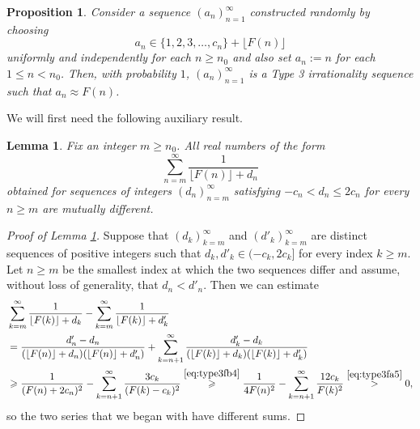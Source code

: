 \documentclass[11pt,letterpaper,reqno]{amsart}
\numberwithin{equation}{section}
\newtheorem{lemma}[theorem]{Lemma}
\newtheorem{proposition}[theorem]{Proposition}
\theoremstyle{definition}
\numberwithin{equation}{section}
\begin{document}
\begin{proposition}\label{prop:type3faster}
Consider a sequence $(a_n)_{n=1}^{\infty}$ constructed randomly by choosing
\[ a_n \in \{1,2,3,\ldots,c_n\} + \lfloor F(n)\rfloor \]
uniformly and independently for each $n\geqslant n_0$ and also set $a_n := n$ for each $1\leqslant n<n_0$.
Then, with probability $1$, $(a_n)_{n=1}^{\infty}$ is a Type 3 irrationality sequence such that $a_n \approx F(n)$.
\end{proposition}

We will first need the following auxiliary result.

\begin{lemma}\label{lm:type3fa}
Fix an integer $m\geqslant n_0$.
All real numbers of the form
\[ \sum_{n=m}^{\infty} \frac{1}{\lfloor F(n)\rfloor + d_n} \]
obtained for sequences of integers $(d_n)_{n=m}^{\infty}$ satisfying $-c_n< d_n\leqslant 2c_n$ for every $n\geqslant m$
are mutually different.
\end{lemma}

\begin{proof}[Proof of Lemma \ref{lm:type3fa}]
Suppose that $(d_k)_{k=m}^{\infty}$ and $(d'_k)_{k=m}^{\infty}$ are distinct sequences of positive integers such that $d_k,d'_k\in (-c_k, 2c_k]$ for every index $k\geqslant m$. Let $n\geqslant m$ be the smallest index at which the two sequences differ and assume, without loss of generality, that $d_n<d'_n$.
Then we can estimate
\begin{align*}
& \sum_{k=m}^{\infty} \frac{1}{\lfloor F(k)\rfloor + d_k} - \sum_{k=m}^{\infty} \frac{1}{\lfloor F(k)\rfloor + d'_k} \\
& = \frac{d'_n - d_n}{(\lfloor F(n)\rfloor + d_n)(\lfloor F(n)\rfloor + d'_n)} + \sum_{k=n+1}^{\infty} \frac{d'_k - d_k}{(\lfloor F(k)\rfloor + d_k)(\lfloor F(k)\rfloor + d'_k)} \\
& \geqslant \frac{1}{(F(n) + 2c_n)^2} - \sum_{k=n+1}^{\infty} \frac{3c_k}{(F(k) - c_k)^2}
\stackrel{\eqref{eq:type3fb4}}{\geqslant} \frac{1}{4F(n)^2} - \sum_{k=n+1}^{\infty} \frac{12c_k}{F(k)^2}
\stackrel{\eqref{eq:type3fa5}}{>} 0,
\end{align*}
so the two series that we began with have different sums.
\end{proof}
\end{document}
